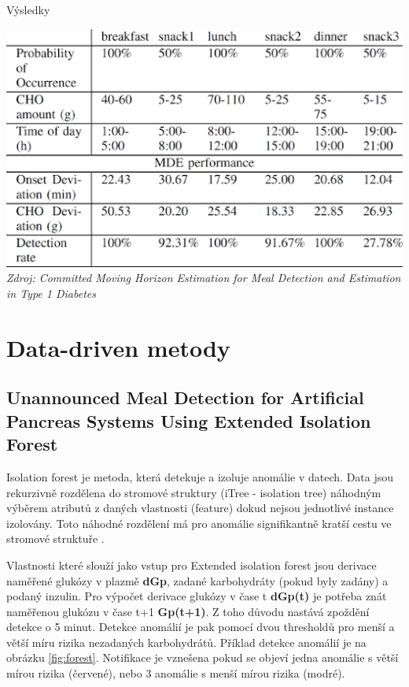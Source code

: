 \begin{table}[H]
\caption{Výsledky}
\label{tab:horizon5}
\centering
\includegraphics[width=1\textwidth]{img/analyza/horizon5.png}\\
\textit{Zdroj: Committed Moving Horizon Estimation for Meal Detection and Estimation in Type 1 Diabetes \citep{Analyza.MovingHorizon}}
\end{table}


\section{Data-driven metody}
\subsection{Unannounced Meal Detection for Artificial Pancreas Systems Using Extended Isolation Forest}
\label{ch:forest}

Isolation forest je metoda, která detekuje a izoluje anomálie v datech. Data jsou rekurzivně rozdělena do stromové struktury (iTree - isolation tree) náhodným výběrem atributů z daných vlastnosti (feature) dokud nejsou jednotlivé instance izolovány. Toto náhodné rozdělení má pro anomálie signifikantně kratší cestu ve stromové struktuře \citep{Analyza.IsolationForest}.

Vlastnosti které slouží jako vstup pro Extended isolation forest \citep{Analyza.ExtendedIsolationForest} jsou derivace naměřené glukózy v plazmě \textbf{dGp}, zadané karbohydráty (pokud byly zadány) a podaný inzulin. Pro výpočet derivace glukózy v čase t \textbf{dGp(t)} je potřeba znát naměřenou glukózu v čase t+1 \textbf{Gp(t+1)}. Z toho důvodu nastává zpoždění detekce o 5 minut. Detekce anomálií je pak pomocí dvou thresholdů pro menší a větší míru rizika nezadaných karbohydrátů.
Příklad detekce anomálií je na obrázku \ref{fig:forest}. Notifikace je vznešena pokud se objeví jedna anomálie s větší mírou rizika (červené), nebo 3 anomálie s menší mírou rizika (modré).

